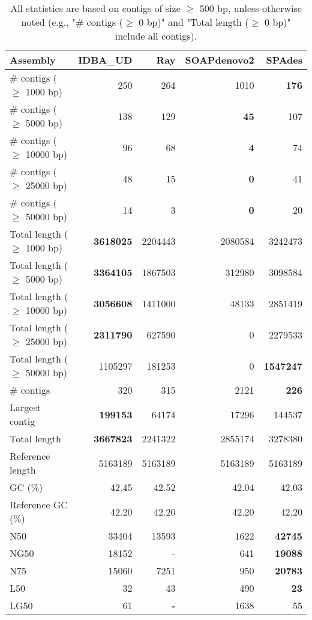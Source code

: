 \documentclass[12pt,a4paper]{article}
\begin{document}
\begin{table}[ht]
\begin{center}
\caption{All statistics are based on contigs of size $\geq$ 500 bp, unless otherwise noted (e.g., "\# contigs ($\geq$ 0 bp)" and "Total length ($\geq$ 0 bp)" include all contigs).}
\begin{tabular}{|l*{4}{|r}|}
\hline
Assembly & IDBA\_UD & Ray & SOAPdenovo2 & SPAdes \\ \hline
\# contigs ($\geq$ 1000 bp) & 250 & 264 & 1010 & {\bf 176} \\ \hline
\# contigs ($\geq$ 5000 bp) & 138 & 129 & {\bf 45} & 107 \\ \hline
\# contigs ($\geq$ 10000 bp) & 96 & 68 & {\bf 4} & 74 \\ \hline
\# contigs ($\geq$ 25000 bp) & 48 & 15 & {\bf 0} & 41 \\ \hline
\# contigs ($\geq$ 50000 bp) & 14 & 3 & {\bf 0} & 20 \\ \hline
Total length ($\geq$ 1000 bp) & {\bf 3618025} & 2204443 & 2080584 & 3242473 \\ \hline
Total length ($\geq$ 5000 bp) & {\bf 3364105} & 1867503 & 312980 & 3098584 \\ \hline
Total length ($\geq$ 10000 bp) & {\bf 3056608} & 1411000 & 48133 & 2851419 \\ \hline
Total length ($\geq$ 25000 bp) & {\bf 2311790} & 627590 & 0 & 2279533 \\ \hline
Total length ($\geq$ 50000 bp) & 1105297 & 181253 & 0 & {\bf 1547247} \\ \hline
\# contigs & 320 & 315 & 2121 & {\bf 226} \\ \hline
Largest contig & {\bf 199153} & 64174 & 17296 & 144537 \\ \hline
Total length & {\bf 3667823} & 2241322 & 2855174 & 3278380 \\ \hline
Reference length & 5163189 & 5163189 & 5163189 & 5163189 \\ \hline
GC (\%) & 42.45 & 42.52 & 42.04 & 42.03 \\ \hline
Reference GC (\%) & 42.20 & 42.20 & 42.20 & 42.20 \\ \hline
N50 & 33404 & 13593 & 1622 & {\bf 42745} \\ \hline
NG50 & 18152 & - & 641 & {\bf 19088} \\ \hline
N75 & 15060 & 7251 & 950 & {\bf 20783} \\ \hline
L50 & 32 & 43 & 490 & {\bf 23} \\ \hline
LG50 & 61 & {\bf -} & 1638 & 55 \\ \hline

\end{tabular}
\end{center}
\end{table}
\end{document}
